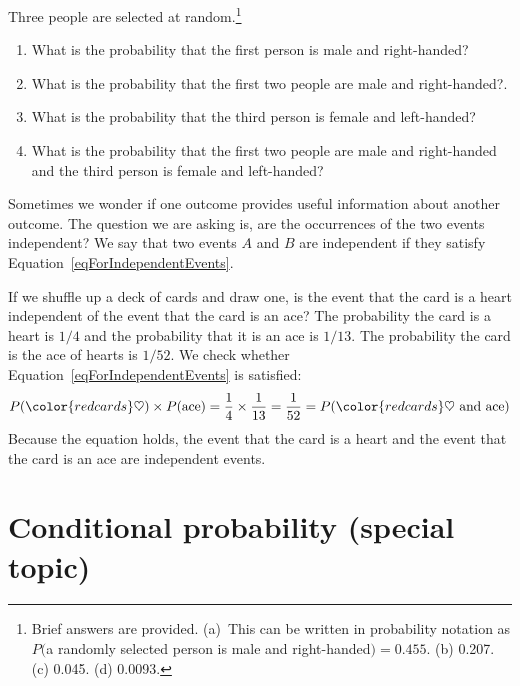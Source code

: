 \begin{exercise}
Three people are selected at random.\footnote{Brief answers are provided. (a)~This can be written in probability notation as $P($a randomly selected person is male and right-handed$)=0.455$. (b) 0.207. (c) 0.045. (d) 0.0093.} \vspace{-1.5mm}
\begin{enumerate}
\setlength{\itemsep}{0mm}
\item[(a)] What is the probability that the first person is male and right-handed?
\item[(b)] What is the probability that the first two people are male and right-handed?.
\item[(c)] What is the probability that the third person is female and left-handed?
\item[(d)] What is the probability that the first two people are male and right-handed and the third person is female and left-handed?
\end{enumerate}
\end{exercise}

Sometimes we wonder if one outcome provides useful information about another outcome. The question we are asking is, are the occurrences of the two events independent? We say that two events $A$ and $B$ are independent if they satisfy Equation~\eqref{eqForIndependentEvents}.

\begin{example}{If we shuffle up a deck of cards and draw one, is the event that the card is a heart independent of the event that the card is an ace?}
The probability the card is a heart is $1/4$ and the probability that it is an ace is $1/13$. The probability the card is the ace of hearts is $1/52$. We check whether Equation~\ref{eqForIndependentEvents} is satisfied:
\begin{align*}
P({\color{redcards}\heartsuit})\times P(\text{ace}) = \frac{1}{4}\times \frac{1}{13} = \frac{1}{52} 
					= P({\color{redcards}\heartsuit}\text{ and ace})
\end{align*}
Because the equation holds, the event that the card is a heart and the event that the card is an ace are independent events.
\end{example}

\section{Conditional probability (special topic)}
\label{conditionalProbabilitySection}

